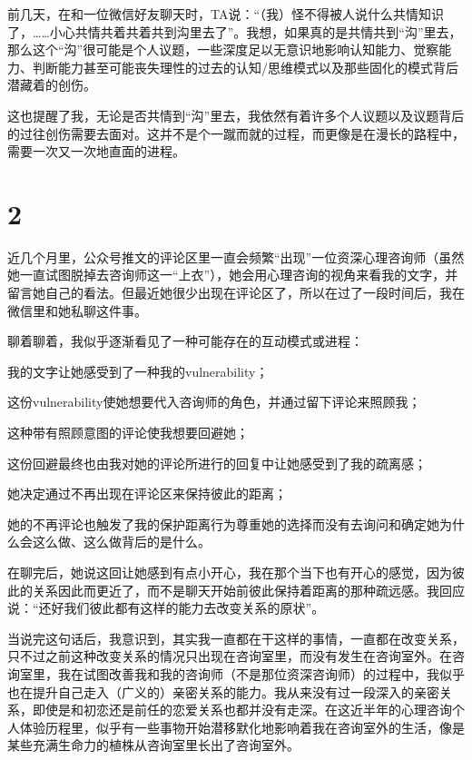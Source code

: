 前几天，在和一位微信好友聊天时，TA说：“（我）怪不得被人说什么共情知识了，……小心共情共着共着共到沟里去了”。我想，如果真的是共情共到“沟”里去，那么这个“沟”很可能是个人议题，一些深度足以无意识地影响认知能力、觉察能力、判断能力甚至可能丧失理性的过去的认知/思维模式以及那些固化的模式背后潜藏着的创伤。

这也提醒了我，无论是否共情到“沟”里去，我依然有着许多个人议题以及议题背后的过往创伤需要去面对。这并不是个一蹴而就的过程，而更像是在漫长的路程中，需要一次又一次地直面的进程。


\section*{2}

近几个月里，公众号推文的评论区里一直会频繁“出现”一位资深心理咨询师（虽然她一直试图脱掉去咨询师这一“上衣”），她会用心理咨询的视角来看我的文字，并留言她自己的看法。但最近她很少出现在评论区了，所以在过了一段时间后，我在微信里和她私聊这件事。

聊着聊着，我似乎逐渐看见了一种可能存在的互动模式或进程：

\begin{compactitem}
    \item 我的文字让她感受到了一种我的vulnerability；
    \item 这份vulnerability使她想要代入咨询师的角色，并通过留下评论来照顾我；
    \item 这种带有照顾意图的评论使我想要回避她；
    \item 这份回避最终也由我对她的评论所进行的回复中让她感受到了我的疏离感；
    \item 她决定通过不再出现在评论区来保持彼此的距离；
    \item 她的不再评论也触发了我的保护距离行为\pozhehao{}尊重她的选择而没有去询问和确定她为什么会这么做、这么做背后的是什么。
\end{compactitem}

在聊完后，她说这回让她感到有点小开心，我在那个当下也有开心的感觉，因为彼此的关系因此而更近了，而不是聊天开始前彼此保持着距离的那种疏远感。我回应说：“还好我们彼此都有这样的能力去改变关系的原状”。

当说完这句话后，我意识到，其实我一直都在干这样的事情，一直都在改变关系，只不过之前这种改变关系的情况只出现在咨询室里，而没有发生在咨询室外。在咨询室里，我在试图改善我和我的咨询师（不是那位资深咨询师）的过程中，我似乎也在提升自己走入（广义的）亲密关系的能力。我从来没有过一段深入的亲密关系，即使是和初恋还是前任的恋爱关系也都并没有走深。在这近半年的心理咨询个人体验历程里，似乎有一些事物开始潜移默化地影响着我在咨询室外的生活，像是某些充满生命力的植株从咨询室里长出了咨询室外。

